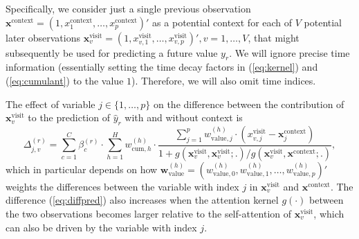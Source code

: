\documentclass[AMA,Times1COL]{WileyNJDv5} %
\begin{document}
Specifically, we consider just a single previous observation $\mathbf{x}^{\mathrm{context}} = \left(1, x^\mathrm{context}_{1}, \ldots, x^\mathrm{context}_{p}\right)'$ as a potential context for each of $V$ potential later observations $\mathbf{x}^{\mathrm{visit}}_v = \left(1, x^\mathrm{visit}_{v,1}, \ldots, x^\mathrm{visit}_{v,p}\right)', v=1,\ldots,V $, that might subsequently be used for predicting a future value $y_r$. We will ignore precise time information (essentially setting the time decay factors in (\ref{eq:kernel}) and (\ref{eq:cumulant}) to the value $1$). Therefore, we will also omit time indices. 


The effect of variable $j\in\{1,\ldots,p\}$ on the difference between the contribution of $\mathbf{x}_v^{\mathrm{visit}}$ to the prediction of $\hat{y}_r$ with and without context is
\begin{equation}\label{eq:diffpred}
\Delta^{(r)}_{j, v} =
\sum_{c=1}^{C} \beta_{c}^{(r)} \cdot \sum_{h=1}^{H}  w_{\mathrm{cum}, h}^{(h)} \cdot \frac{
  \sum_{j=1}^{p} w^{(h)}_{\textrm{value},j}\cdot \left(x_{v,j}^\mathrm{visit} - \mathbf{x}_{j}^\mathrm{context}\right)}
{1 +g(\mathbf{x}_v^{\mathrm{visit}}, \mathbf{x}_v^{\mathrm{visit}}; .)/g(\mathbf{x}_v^{\mathrm{visit}}, \mathbf{x}^{\mathrm{context}}; .)},
\end{equation}
which in particular depends on how $\mathbf{w}_{\textrm{value}}^{(h)} = (w_{\textrm{value}, 0}^{(h)},w_{\textrm{value}, 1}^{(h)}, \ldots, w_{\textrm{value}, p}^{(h)})'$ weights the differences between the variable with index $j$ in $\mathbf{x}_v^{\mathrm{visit}}$ and $\mathbf{x}^{\mathrm{context}}$. The difference (\ref{eq:diffpred}) also increases when the attention kernel $g(\cdot)$ between the two observations becomes larger relative to the self-attention of $\mathbf{x}_v^{\mathrm{visit}}$, which can also be driven by the variable with index $j$.
\end{document}
